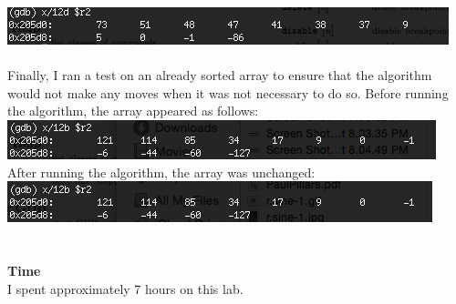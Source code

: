 \documentclass[11pt,letterpaper]{article}
\newcommand{\header}{\noindent\textbf}
\begin{document}
\includegraphics[scale=1.0]{test2After}\\\\
Finally, I ran a test on an already sorted array to ensure that the algorithm would not make any moves when it was not necessary to do so. Before running the algorithm, the array appeared as follows:\\
\includegraphics[scale=1.0]{test3Before}\\
After running the algorithm, the array was unchanged:\\
\includegraphics[scale=1.0]{test3After}\\\\\\

\header{Time}\\
I spent approximately 7 hours on this lab.
\end{document}
